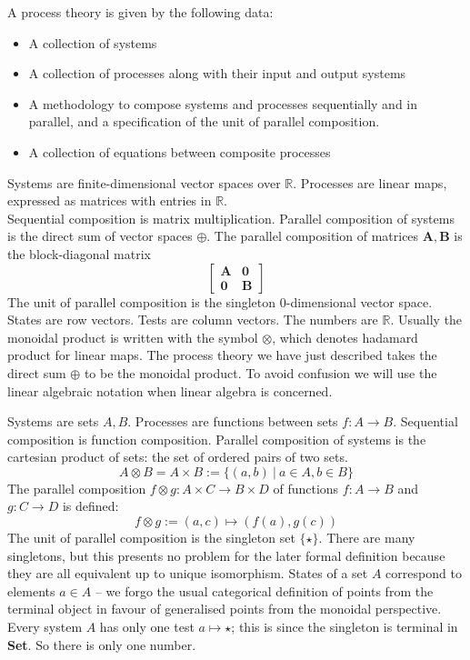 A process theory is given by the following data:
\begin{itemize}
    \item A collection of systems
    \item A collection of processes along with their input and output systems
    \item A methodology to compose systems and processes sequentially and in parallel, and a specification of the unit of parallel composition.
    \item A collection of equations between composite processes
\end{itemize}

\begin{example}
Systems are finite-dimensional vector spaces over $\mathbb{R}$. Processes are linear maps, expressed as matrices with entries in $\mathbb{R}$.\\
Sequential composition is matrix multiplication. Parallel composition of systems is the direct sum of vector spaces $\oplus$. The parallel composition of matrices $\mathbf{A}, \mathbf{B}$ is the block-diagonal matrix
$$\begin{bmatrix}
\mathbf{A} & \mathbf{0} \\
\mathbf{0} & \mathbf{B}
\end{bmatrix}$$
The unit of parallel composition is the singleton 0-dimensional vector space.
States are row vectors. Tests are column vectors. The numbers are $\mathbb{R}$. Usually the monoidal product is written with the symbol $\otimes$, which denotes hadamard product for linear maps. The process theory we have just described takes the direct sum $\oplus$ to be the monoidal product. To avoid confusion we will use the linear algebraic notation when linear algebra is concerned.
\end{example}

\begin{example}
Systems are sets $A,B$. Processes are functions between sets $f: A \rightarrow B$. Sequential composition is function composition. Parallel composition of systems is the cartesian product of sets: the set of ordered pairs of two sets.
\[A \otimes B = A \times B := \{(a,b) \ | \ a \in A, b \in B\}\]
The parallel composition $f \otimes g : A \times C \rightarrow B \times D$ of functions $f: A \rightarrow B$ and $g: C \rightarrow D$ is defined:
\[f \otimes g := (a,c) \mapsto (f(a),g(c))\]
The unit of parallel composition is the singleton set $\{\star\}$. There are many singletons, but this presents no problem for the later formal definition because they are all equivalent up to unique isomorphism. States of a set $A$ correspond to elements $a \in A$ --  we forgo the usual categorical definition of points from the terminal object in favour of generalised points from the monoidal perspective. Every system $A$ has only one test $a \mapsto \star$; this is since the singleton is terminal in \textbf{Set}. So there is only one number.
\end{example}

